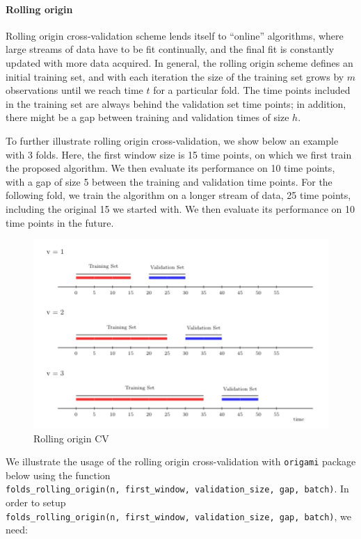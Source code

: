 \documentclass[12pt, krantz2,]{krantz}
\let\oldparagraph\paragraph
\renewcommand{\paragraph}[1]{\oldparagraph{#1}\mbox{}}
\theoremstyle{definition}
\theoremstyle{definition}
\theoremstyle{definition}
\newcommand{\1}{\mathbbm{1}}
\begin{document}
\hypertarget{rolling-origin}{%
\paragraph{Rolling origin}\label{rolling-origin}}

Rolling origin cross-validation scheme lends itself to ``online'' algorithms,
where large streams of data have to be fit continually, and the final fit is
constantly updated with more data acquired. In general, the rolling origin
scheme defines an initial training set, and with each iteration the size of the
training set grows by \(m\) observations until we reach time \(t\) for a particular
fold. The time points included in the training set are always behind the
validation set time points; in addition, there might be a gap between training
and validation times of size \(h\).

To further illustrate rolling origin cross-validation, we show below an example
with 3 folds. Here, the first window size is 15 time points, on which we first
train the proposed algorithm. We then evaluate its performance on 10 time
points, with a gap of size 5 between the training and validation time points.
For the following fold, we train the algorithm on a longer stream of data, 25
time points, including the original 15 we started with. We then evaluate its
performance on 10 time points in the future.

\begin{figure}

{\centering \includegraphics[width=0.8\linewidth]{img/image/rolling_origin} 

}

\caption{Rolling origin CV}\label{fig:unnamed-chunk-1}
\end{figure}

We illustrate the usage of the rolling origin cross-validation with \texttt{origami}
package below using the function \texttt{folds\_rolling\_origin(n,\ first\_window,\ validation\_size,\ gap,\ batch)}. In order to setup \texttt{folds\_rolling\_origin(n,\ first\_window,\ validation\_size,\ gap,\ batch)}, we need:
\end{document}
